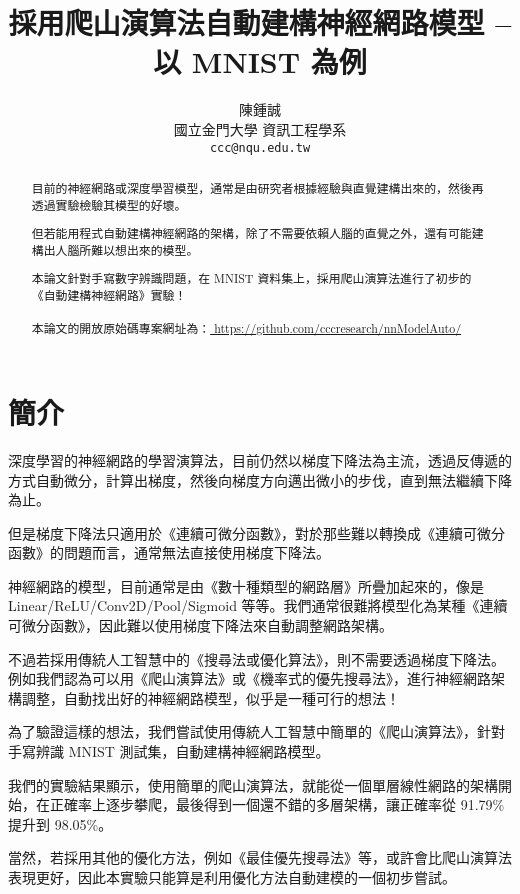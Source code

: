 \documentclass{article}
\title{採用爬山演算法自動建構神經網路模型 -- 以 MNIST 為例}
\author{
    陳鍾誠 \\
    國立金門大學 資訊工程學系\\
    \texttt{ccc@nqu.edu.tw} \\
}
\begin{document}
\maketitle

\begin{abstract}
目前的神經網路或深度學習模型，通常是由研究者根據經驗與直覺建構出來的，然後再透過實驗檢驗其模型的好壞。

但若能用程式自動建構神經網路的架構，除了不需要依賴人腦的直覺之外，還有可能建構出人腦所難以想出來的模型。

本論文針對手寫數字辨識問題，在 MNIST 資料集上，採用爬山演算法進行了初步的《自動建構神經網路》實驗！
\\
\\
本論文的開放原始碼專案網址為：\url{ https://github.com/cccresearch/nnModelAuto/ }
\end{abstract}




\section{簡介}

深度學習的神經網路的學習演算法，目前仍然以梯度下降法為主流，透過反傳遞的方式自動微分，計算出梯度，然後向梯度方向邁出微小的步伐，直到無法繼續下降為止。

但是梯度下降法只適用於《連續可微分函數》，對於那些難以轉換成《連續可微分函數》的問題而言，通常無法直接使用梯度下降法。

神經網路的模型，目前通常是由《數十種類型的網路層》所疊加起來的，像是 Linear/ReLU/Conv2D/Pool/Sigmoid 等等。我們通常很難將模型化為某種《連續可微分函數》，因此難以使用梯度下降法來自動調整網路架構。

不過若採用傳統人工智慧中的《搜尋法或優化算法》，則不需要透過梯度下降法。例如我們認為可以用《爬山演算法》或《機率式的優先搜尋法》，進行神經網路架構調整，自動找出好的神經網路模型，似乎是一種可行的想法！

為了驗證這樣的想法，我們嘗試使用傳統人工智慧中簡單的《爬山演算法》，針對手寫辨識 MNIST 測試集，自動建構神經網路模型。

我們的實驗結果顯示，使用簡單的爬山演算法，就能從一個單層線性網路的架構開始，在正確率上逐步攀爬，最後得到一個還不錯的多層架構，讓正確率從 91.79\% 提升到 98.05\%。

當然，若採用其他的優化方法，例如《最佳優先搜尋法》等，或許會比爬山演算法表現更好，因此本實驗只能算是利用優化方法自動建模的一個初步嘗試。
\end{document}

